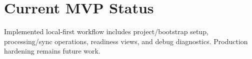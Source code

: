\section{Current MVP Status}
Implemented local-first workflow includes project/bootstrap setup, processing/sync operations, readiness views, and debug diagnostics. Production hardening remains future work.

